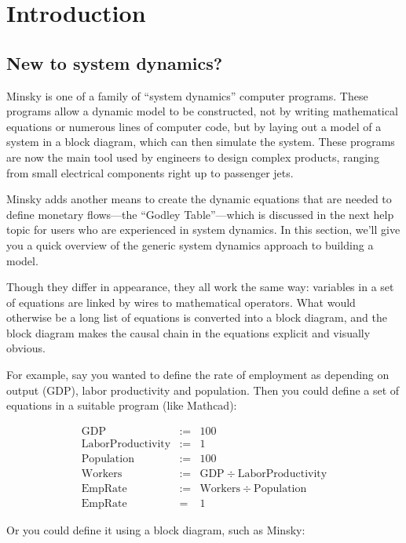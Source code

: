 \chapter{Introduction}
\label{Introduction}

\section{New to system dynamics?}
\label{intro:new}

Minsky is one of a family of ``system dynamics'' computer
programs. These programs allow a dynamic model to be constructed, not
by writing mathematical equations or numerous lines of computer code,
but by laying out a model of a system in a block diagram, which can then
simulate the system. These programs are now the main tool used by
engineers to design complex products, ranging from small electrical
components right up to passenger jets.


Minsky adds another means to create the dynamic equations that are
needed to define monetary flows---the ``Godley Table''---which is
discussed in the next help topic for users who are experienced in
system dynamics. In this section, we'll give you a quick overview of
the generic system dynamics approach to building a model.


Though they differ in appearance, they all work the same way:
variables in a set of equations are linked by wires to mathematical
operators. What would otherwise be a long list of equations is
converted into a block diagram, and the block diagram makes the causal chain
in the equations explicit and visually obvious.

For example, say you wanted to define the rate of employment as
depending on output (GDP), labor productivity and population. Then you
could define a set of equations in a suitable program (like Mathcad):

\begin{eqnarray*}
\mathrm{GDP}&:=&100\\
\mathrm{LaborProductivity}&:=&1\\
\mathrm{Population}&:=&100\\
\mathrm{Workers}&:=&\mathrm{GDP}\div\mathrm{LaborProductivity}\\
\mathrm{EmpRate}&:=&\mathrm{Workers}\div\mathrm{Population}\\
\mathrm{EmpRate}&=&1
\end{eqnarray*}

Or you could define it using a block diagram, such as Minsky:

